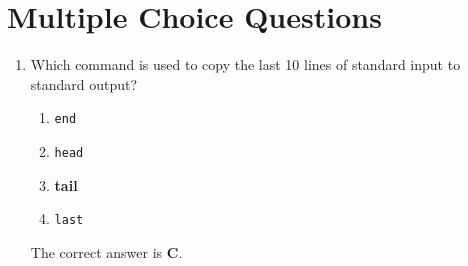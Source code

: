 \documentclass{article}
\author{JOHN BWALE}
\date{22,september-2023}
\begin{document}
\section*{Multiple Choice Questions}

\begin{enumerate}
    \item Which command is used to copy the last 10 lines of standard input to standard output?
    \begin{enumerate}
        \item \texttt{end}
        \item \texttt{head}
        \item \textbf{tail}
        \item \texttt{last}

    \end{enumerate}
The correct answer is \textbf{C}.
    

\end{enumerate}
\end{document}
